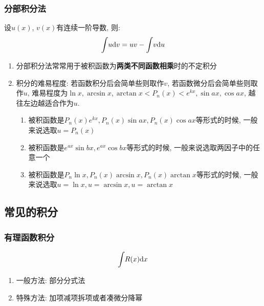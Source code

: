 \subsubsection{分部积分法}
设$ u(x) $, $ v(x) $有连续一阶导数, 则:
\begin{equation*}
    \displaystyle\int_{}\hspace{.2em}u \mathrm{d}v=uv-\displaystyle\int_{}\hspace{.2em}v \mathrm{d}u
\end{equation*}
\begin{tcolorbox}
    \begin{enumerate}
        \item 分部积分法常常用于被积函数为\textbf{两类不同函数相乘}时的不定积分
        \item 积分的难易程度: 若函数积分后会简单些则取作$ v $, 若函数微分后会简单些则取作$ u $, 难易程度为$ \ln x, \arcsin x, \arctan x<P_{n}(x)<e^{kx}, \sin ax, \cos ax $, 越往左边越适合作为$ u $.
              \begin{enumerate}
                  \item 被积函数是$ P_{n}(x)e^{kx}, P_{n}(x)\sin ax, P_{n}(x)\cos ax $等形式的时候, 一般来说选取$ u=P_{n}(x) $
                  \item 被积函数是$ e^{ax}\sin bx, e^{ax}\cos bx $等形式的时候, 一般来说选取两因子中的任意一个
                  \item 被积函数是$ P_{n}\ln x, P_{n}(x)\arcsin x, P_{n}(x)\arctan x $等形式的时候, 一般来说选取$ u=\ln x, u=\arcsin x, u=\arctan x $
              \end{enumerate}
    \end{enumerate}
\end{tcolorbox}
\subsection{常见的积分}
\subsubsection{有理函数积分}
\begin{equation*}
    \displaystyle\int_{}\hspace{.2em}R(x)\mathrm{d}x
\end{equation*}\par
\begin{enumerate}
    \item 一般方法: 部分分式法
    \item 特殊方法: 加项减项拆项或者凑微分降幂
\end{enumerate}
